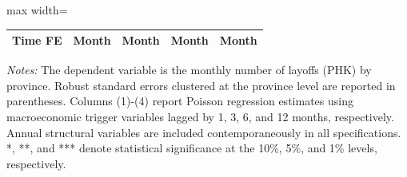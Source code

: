 \begin{table}[H]
\begin{adjustbox}{max width=\textwidth}
\begin{tabular}{l*{4}{c}}
Time FE     &       Month         &       Month         &       Month         &       Month         \\
\bottomrule
\end{tabular}
\end{adjustbox}
\begin{tablenotes}
\footnotesize
\item \textit{Notes:} The dependent variable is the monthly number of layoffs (PHK) by province. Robust standard errors clustered at the province level are reported in parentheses. Columns (1)-(4) report Poisson regression estimates using macroeconomic trigger variables lagged by 1, 3, 6, and 12 months, respectively. Annual structural variables are included contemporaneously in all specifications. *, **, and *** denote statistical significance at the 10\%, 5\%, and 1\% levels, respectively.
\end{tablenotes}
\end{table}
